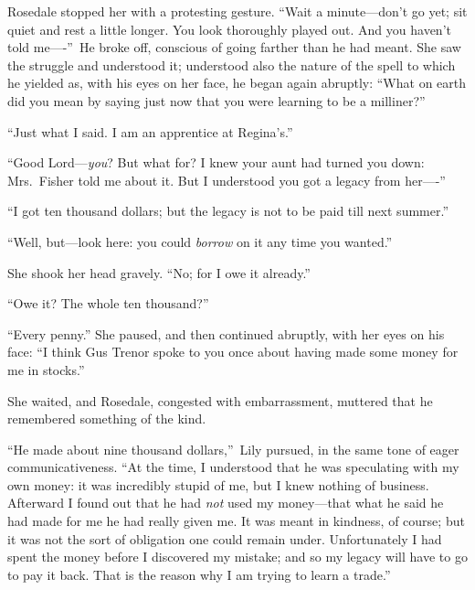 \documentclass[12pt,a4paper]{book}
\begin{document}
Rosedale stopped her with a protesting gesture. ``Wait a
minute---don't go yet; sit quiet and rest a little longer. You
look thoroughly played out. And you haven't told me----''\ He broke
off, conscious of going farther than he had meant. She saw the
struggle and understood it; understood also the nature of the
spell to which he yielded as, with his eyes on her face, he began
again abruptly: ``What on earth did you mean by saying just now
that you were learning to be a milliner?''





``Just what I said. I am an apprentice at Regina's.''





``Good Lord---\textit{you}? But what for? I knew your aunt had
turned you down: Mrs.\ Fisher told me about it. But I understood
you got a legacy from her----''





``I got ten thousand dollars; but the legacy is not to be paid
till next summer.''





``Well, but---look here: you could \textit{borrow} on it any time you
wanted.''





She shook her head gravely. ``No; for I owe it already.''





``Owe it? The whole ten thousand?''





``Every penny.'' She paused, and then continued abruptly, with her
eyes on his face: ``I think Gus Trenor spoke to you once about
having made some money for me in stocks.''





She waited, and Rosedale, congested with embarrassment, muttered
that he remembered something of the kind.





``He made about nine thousand dollars,''\ Lily pursued, in the same
tone of eager communicativeness. ``At the time, I understood that
he was speculating with my own money: it was incredibly stupid of
me, but I knew nothing of business. Afterward I found out that he
had \textit{not} used my money---that what he said he had made for me he
had really given me. It was meant in kindness, of course; but it
was not the sort of obligation one could remain under. 
Unfortunately I had spent the money before I discovered my
mistake; and so my legacy will have to go to pay it back. That is
the reason why I am trying to learn a trade.''
\end{document}
